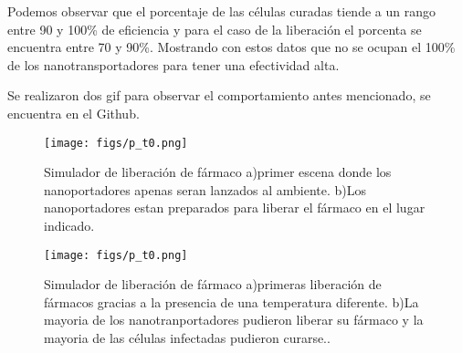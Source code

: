 \documentclass[a4paper,fleqn]{cas-sc}
\begin{document}
Podemos observar que el porcentaje de las células curadas tiende a un rango entre 90 y 100\% de eficiencia y para el caso de la liberación el porcenta se encuentra entre 70 y 90\%.
Mostrando con estos datos que no se ocupan el 100\% de los nanotransportadores para tener una efectividad alta. 

Se realizaron dos gif para observar el comportamiento antes mencionado, se encuentra en el Github.

\begin{figure}[h]
	\centering
		\texttt{[image: figs/p\_t0.png]}
	\caption{Simulador de liberación de fármaco a)primer escena donde los nanoportadores apenas seran lanzados al ambiente. b)Los nanoportadores estan preparados para liberar el fármaco en el lugar indicado.}
	\label{FIG:1}
\end{figure}

\begin{figure}[h]
	\centering
		\texttt{[image: figs/p\_t0.png]}
	\caption{Simulador de liberación de fármaco a)primeras liberación de fármacos gracias a la presencia de una temperatura diferente. b)La mayoria de los nanotranportadores pudieron liberar su fármaco y la mayoria de las células infectadas pudieron curarse..}
	\label{FIG:1}
\end{figure}

%





\end{document}
